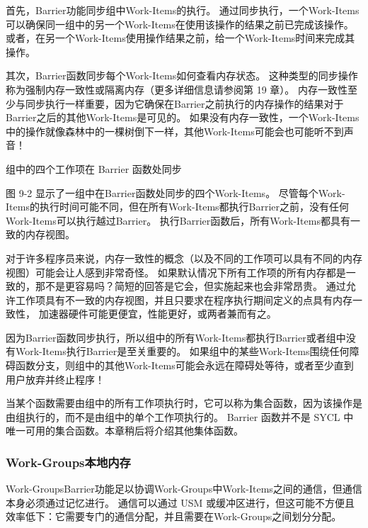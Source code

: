 首先，Barrier功能同步组中Work-Items的执行。 
通过同步执行，一个Work-Items可以确保同一组中的另一个Work-Items在使用该操作的结果之前已完成该操作。 
或者，在另一个Work-Items使用操作结果之前，给一个Work-Items时间来完成其操作。

其次，Barrier函数同步每个Work-Items如何查看内存状态。 
这种类型的同步操作称为强制内存一致性或隔离内存（更多详细信息请参阅第 19 章）。 
内存一致性至少与同步执行一样重要，因为它确保在Barrier之前执行的内存操作的结果对于Barrier之后的其他Work-Items是可见的。 
如果没有内存一致性，一个Work-Items中的操作就像森林中的一棵树倒下一样，其他Work-Items可能会也可能听不到声音！

{\color{red} 组中的四个工作项在 Barrier 函数处同步}

图 9-2 显示了一组中在Barrier函数处同步的四个Work-Items。 
尽管每个Work-Items的执行时间可能不同，但在所有Work-Items都执行Barrier之前，没有任何Work-Items可以执行越过Barrier。 
执行Barrier函数后，所有Work-Items都具有一致的内存视图。

\begin{remark}[为什么默认情况下内存不一致？]
对于许多程序员来说，内存一致性的概念（以及不同的工作项可以具有不同的内存视图）可能会让人感到非常奇怪。
如果默认情况下所有工作项的所有内存都是一致的，那不是更容易吗？简短的回答是它会，但实施起来也会非常昂贵。
通过允许工作项具有不一致的内存视图，并且只要求在程序执行期间定义的点具有内存一致性，
加速器硬件可能更便宜，性能更好，或两者兼而有之。
\end{remark}

因为Barrier函数同步执行，所以组中的所有Work-Items都执行Barrier或者组中没有Work-Items执行Barrier是至关重要的。 
如果组中的某些Work-Items围绕任何障碍函数分支，则组中的其他Work-Items可能会永远在障碍处等待，或者至少直到用户放弃并终止程序！

\begin{remark}[集体函数]
当某个函数需要由组中的所有工作项执行时，它可以称为集合函数，因为该操作是由组执行的，而不是由组中的单个工作项执行的。
Barrier 函数并不是 SYCL 中唯一可用的集合函数。本章稍后将介绍其他集体函数。
\end{remark}

\subsubsection{Work-Groups本地内存}
Work-GroupsBarrier功能足以协调Work-Groups中Work-Items之间的通信，但通信本身必须通过记忆进行。 
通信可以通过 USM 或缓冲区进行，但这可能不方便且效率低下：它需要专门的通信分配，并且需要在Work-Groups之间划分分配。

